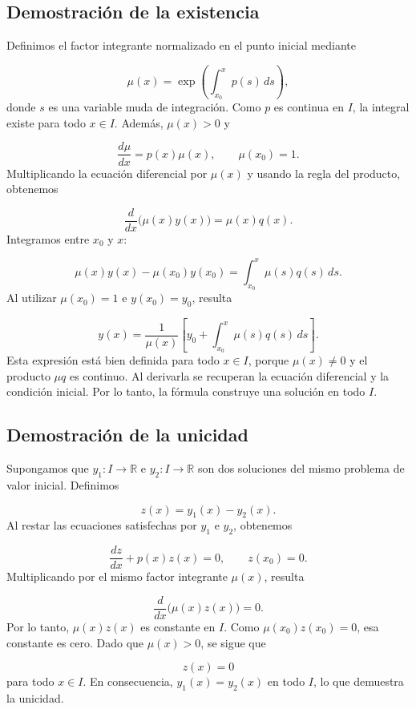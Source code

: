 \documentclass[12pt,a4paper]{article}
\begin{document}
	\subsection{Demostración de la existencia}

	Definimos el factor integrante normalizado en el punto inicial mediante

	\[
	\mu(x)
	=
	\exp\left(\int_{x_0}^{x}p(s)\,ds\right),
	\]
	donde \(s\) es una variable muda de integración. Como \(p\) es continua en \(I\), la integral existe para todo \(x\in I\). Además, \(\mu(x)>0\) y

	\[
	\frac{d\mu}{dx}=p(x)\mu(x),
	\qquad
	\mu(x_0)=1.
	\]
	Multiplicando la ecuación diferencial por \(\mu(x)\) y usando la regla del producto, obtenemos

	\[
	\frac{d}{dx}\bigl(\mu(x)y(x)\bigr)
	=
	\mu(x)q(x).
	\]
	Integramos entre \(x_0\) y \(x\):

	\[
	\mu(x)y(x)-\mu(x_0)y(x_0)
	=
	\int_{x_0}^{x}\mu(s)q(s)\,ds.
	\]
	Al utilizar \(\mu(x_0)=1\) e \(y(x_0)=y_0\), resulta

	\[
	\boxed{
	y(x)
	=
	\frac{1}{\mu(x)}
	\left[
	 y_0+\int_{x_0}^{x}\mu(s)q(s)\,ds
	\right].
	}
	\]
	Esta expresión está bien definida para todo \(x\in I\), porque \(\mu(x)\neq0\) y el producto \(\mu q\) es continuo. Al derivarla se recuperan la ecuación diferencial y la condición inicial. Por lo tanto, la fórmula construye una solución en todo \(I\).

	\subsection{Demostración de la unicidad}

	Supongamos que \(y_1:I\to\mathbb{R}\) e \(y_2:I\to\mathbb{R}\) son dos soluciones del mismo problema de valor inicial. Definimos

	\[
	z(x)=y_1(x)-y_2(x).
	\]
	Al restar las ecuaciones satisfechas por \(y_1\) e \(y_2\), obtenemos

	\[
	\frac{dz}{dx}+p(x)z(x)=0,
	\qquad
	z(x_0)=0.
	\]
	Multiplicando por el mismo factor integrante \(\mu(x)\), resulta

	\[
	\frac{d}{dx}\bigl(\mu(x)z(x)\bigr)=0.
	\]
	Por lo tanto, \(\mu(x)z(x)\) es constante en \(I\). Como \(\mu(x_0)z(x_0)=0\), esa constante es cero. Dado que \(\mu(x)>0\), se sigue que

	\[
	z(x)=0
	\]
	para todo \(x\in I\). En consecuencia, \(y_1(x)=y_2(x)\) en todo \(I\), lo que demuestra la unicidad.
\end{document}
